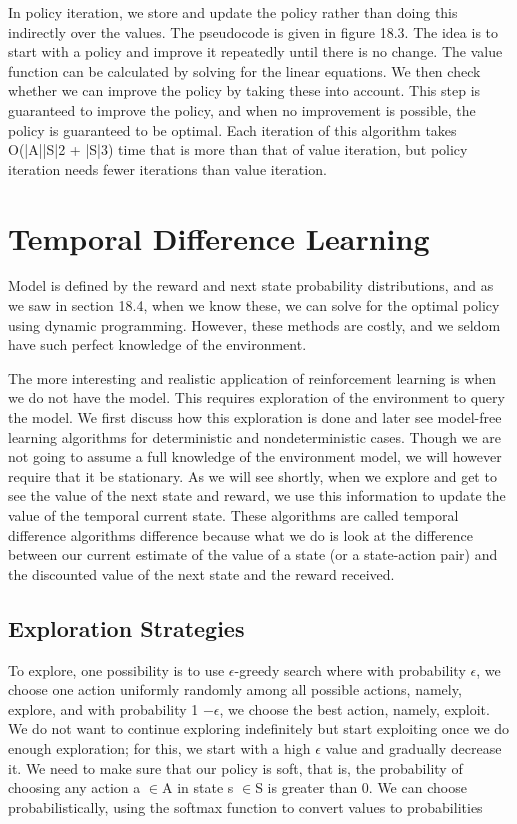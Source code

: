 In policy iteration, we store and update the policy rather than doing this indirectly over the values. The pseudocode is given in figure 18.3. The idea is to start with a policy and improve it repeatedly until there is no change. The value function can be calculated by solving for the linear equations. We then check whether we can improve the policy by taking these into account. This step is guaranteed to improve the policy, and when no improvement is possible, the policy is guaranteed to be optimal. Each iteration of this algorithm takes O(|A||S|2 + |S|3) time that is more than that of value iteration, but policy iteration needs fewer iterations than value iteration.

\section{Temporal Difference Learning}

Model is defined by the reward and next state probability distributions, and as we saw in section 18.4, when we know these, we can solve for the optimal policy using dynamic programming. However, these methods are costly, and we seldom have such perfect knowledge of the environment.

The more interesting and realistic application of reinforcement learning is when we do not have the model. This requires exploration of the environment to query the model. We first discuss how this exploration is done and later see model-free learning algorithms for deterministic and nondeterministic cases. Though we are not going to assume a full knowledge of the environment model, we will however require that it be stationary. As we will see shortly, when we explore and get to see the value of the next state and reward, we use this information to update the value of the temporal current state. These algorithms are called temporal difference algorithms difference because what we do is look at the difference between our current estimate of the value of a state (or a state-action pair) and the discounted value of the next state and the reward received.

\subsection{Exploration Strategies}

To explore, one possibility is to use $\epsilon$-greedy search where with probability $\epsilon$, we choose one action uniformly randomly among all possible actions, namely, explore, and with probability 1 $-$$\epsilon$, we choose the best action, namely, exploit. We do not want to continue exploring indefinitely but start exploiting once we do enough exploration; for this, we start with a high $\epsilon$ value and gradually decrease it. We need to make sure that our policy is soft, that is, the probability of choosing any action a $\in$A in state s $\in$S is greater than 0. We can choose probabilistically, using the softmax function to convert values to probabilities

